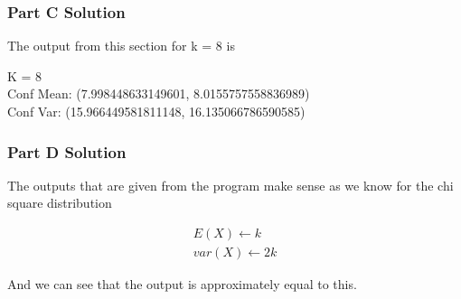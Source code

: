 \documentclass{article}
\begin{document}
			\subsubsection{Part C Solution}
				
				
				\newpage				
				
				The output from this section for k = 8 is 
				
				K =  8\\
Conf Mean:  (7.998448633149601, 8.0155757558836989)\\
Conf Var:  (15.966449581811148, 16.135066786590585)

				
				
			\subsubsection{Part D Solution}
				The outputs that are given from the program make sense as we know for the chi square distribution
				
				\begin{align}
					E(X) \gets k\\
					var(X) \gets 2k 
				\end{align}			
				
				And we can see that the output is approximately equal to this.		
\end{document}
